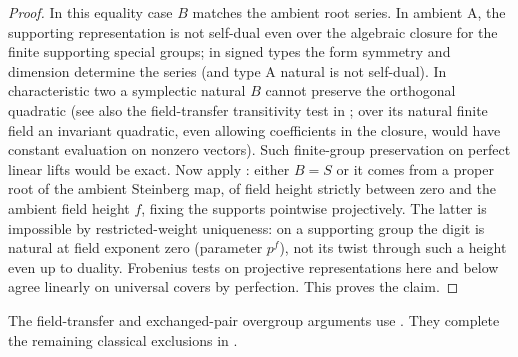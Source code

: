\begin{proof}
In this equality case \(B\) matches the ambient root series. In ambient A, the supporting representation
is not self-dual even over the algebraic closure for the finite supporting special groups; in signed
types the form symmetry and dimension determine the series (and type A natural is not self-dual). In
characteristic two a symplectic natural \(B\) cannot preserve the orthogonal quadratic (see also the
field-transfer transitivity test in ; over its natural finite field an
invariant quadratic, even allowing coefficients
in the closure, would have constant evaluation on nonzero vectors). Such finite-group preservation on
perfect linear lifts would be exact. Now apply : either
\(B=S\) or it comes from a proper root of the ambient Steinberg map, of field height strictly between
zero and the ambient field height \(f\), fixing the supports pointwise projectively. The latter is
impossible by restricted-weight uniqueness: on a supporting group the digit is natural at field exponent
zero (parameter \(p^f\)), not its twist through such a height even up to duality. Frobenius tests on
projective representations here and below agree linearly on universal covers by perfection. This proves
the claim.

\end{proof}

The field-transfer and exchanged-pair overgroup arguments use
.  They complete the remaining
classical exclusions in .
